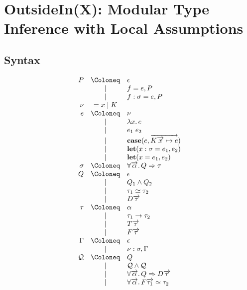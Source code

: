 \section{OutsideIn(X): Modular Type Inference with Local Assumptions}

\cite{Vytiniotis:2011}

\subsection{Syntax}

\begin{align*}
  \begin{array}{rcl}
    P
    &\Coloneq &\epsilon \\
    &\mid &f = e, P \\
    &\mid &f: \sigma = e, P \\
    \nu &= x \mid K \\
    e
    &\Coloneq &\nu \\
    &\mid &\lambda x\ldotp e \\
    &\mid &e_1\; e_2 \\
    &\mid &\mathbf{case}(e, \overrightarrow{K\overrightarrow{x} \mapsto e}) \\
    &\mid &\mathbf{let}(x: \sigma = e_1, e_2) \\
    &\mid &\mathbf{let}(x = e_1, e_2) \\
    \sigma
    &\Coloneq &\forall \overrightarrow{\alpha}\ldotp Q \Rightarrow \tau \\
    Q
    &\Coloneq &\epsilon \\
    &\mid &Q_1 \land Q_2 \\
    &\mid &\tau_1 \simeq \tau_2 \\
    &\mid &D \overrightarrow{\tau} \\
    \tau
    &\Coloneq &\alpha \\
    &\mid &\tau_1 \to \tau_2 \\
    &\mid &T \overrightarrow{\tau} \\
    &\mid &F \overrightarrow{\tau} \\
    \Gamma
    &\Coloneq &\epsilon \\
    &\mid &\nu: \sigma, \Gamma \\
    \mathcal{Q}
    &\Coloneq &Q \\
    &\mid &\mathcal{Q} \land \mathcal{Q} \\
    &\mid &\forall \overrightarrow{\alpha}\ldotp Q \Rightarrow D \overrightarrow{\tau} \\
    &\mid &\forall \overrightarrow{\alpha}\ldotp F \overrightarrow{\tau_1} \simeq \tau_2
  \end{array}
\end{align*}

